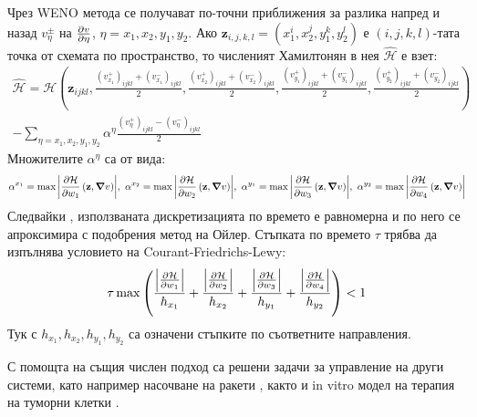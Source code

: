 Чрез WENO метода се получават по-точни приближения за разлика напред и назад $v_{\eta}^{\pm}$ на $\pdv{v}{\eta}$, $\eta = x_1, x_2, y_1, y_2$.
Ако $\mathbf{z}_{i,j,k,l}=(x_1^i, x_2^j, y_1^k, y_2^l)$ е $(i,j,k,l)$-тата точка от схемата по пространство, то численият Хамилтонян в нея $\hat{\mathcal{H}}$ е взет:
\begin{multline}
  \hat{\mathcal{H}} = \mathcal{H}\left(\mathbf{z}_{ijkl}, \frac{(v_{x_1}^+)_{ijkl}+(v_{x_1}^-)_{ijkl}}{2}, \frac{(v_{x_2}^+)_{ijkl}+(v_{x_2}^-)_{ijkl}}{2}, \frac{(v_{y_1}^+)_{ijkl}+(v_{y_1}^-)_{ijkl}}{2}, \frac{(v_{y_2}^+)_{ijkl}+(v_{y_2}^-)_{ijkl}}{2}\right) \\ - \sum_{\eta = x_1, x_2, y_1, y_2} \alpha^{\eta} \frac{(v_{\eta}^+)_{ijkl}-(v_{\eta}^-)_{ijkl}}{2}
\end{multline}
Множителите $\alpha^{\eta}$ са от вида:
\begin{equation}
  \alpha^{x_1} = \max \abs{\pdv{\mathcal{H}}{w_1}\left(\mathbf{z}, \grad{v}\right)},~
  \alpha^{x_2} = \max \abs{\pdv{\mathcal{H}}{w_2}\left(\mathbf{z}, \grad{v}\right)},~
  \alpha^{y_1} = \max \abs{\pdv{\mathcal{H}}{w_3}\left(\mathbf{z}, \grad{v}\right)},~
  \alpha^{y_2} = \max \abs{\pdv{\mathcal{H}}{w_4}\left(\mathbf{z}, \grad{v}\right)}
\end{equation}
Следвайки \cite[глава~3.5]{Osher2003}, използваната дискретизацията по времето е равномерна и по него се апроксимира с подобрения метод на Ойлер.
Стъпката по времето $\tau$ трябва да изпълнява условието на Courant-Friedrichs-Lewy:
\begin{equation}
  \tau \max \left(\frac{\abs{\pdv{\mathcal{H}}{w_1}}}{h_{x_1}} + \frac{\abs{\pdv{\mathcal{H}}{w_2}}}{h_{x_2}} + \frac{\abs{\pdv{\mathcal{H}}{w_3}}}{h_{y_1}} + \frac{\abs{\pdv{\mathcal{H}}{w_4}}}{h_{y_2}}\right) < 1
\end{equation}
Тук с $h_{x_1}, h_{x_2}, h_{y_1}, h_{y_2}$ са означени стъпките по съответните направления.

\begin{remark}
  С помощта на същия числен подход са решени задачи за управление на други системи, като например насочване на ракети \cite{Assellaou2016, Assellaou2018}, както и in vitro модел на терапия на туморни клетки \cite{Carrere2020}.
\end{remark}
